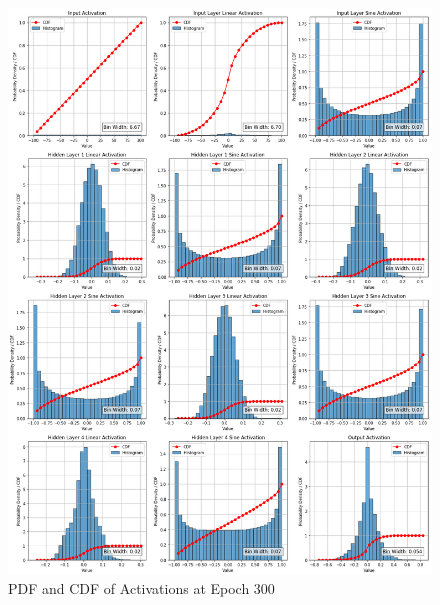 \documentclass{ioereport}
\begin{document}
    \begin{figure}[H]
        \centering
        \includegraphics[width=\linewidth]{assets/audio histogram/epoch300activations.png}
        \caption{PDF and CDF of Activations at Epoch 300}
        \label{fig:audio-activation-300}
    \end{figure}
\end{document}
